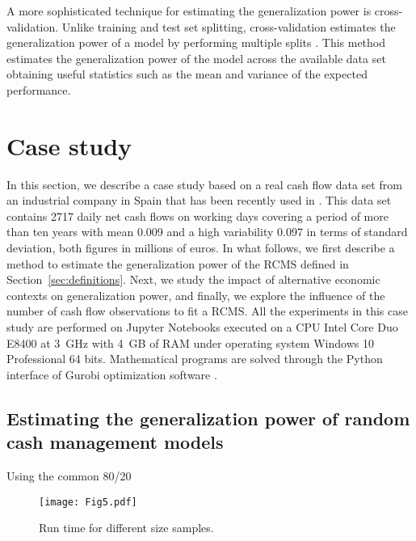 A more sophisticated technique for estimating the generalization power is cross-validation. Unlike training and test set splitting, cross-validation estimates the generalization power of a model by performing multiple splits \citep{hastie2009elements,provost2013data}. This method 
estimates the generalization power of the model across the available data set obtaining useful statistics such as the mean and variance of the expected performance.


\section{Case study\label{sec:case}}


In this section, we describe a case study based on a real cash flow data set from an industrial company in Spain that has been recently used in \cite{salas2017empowering}. This data set contains 2717 daily net cash flows on working days covering a period of more than ten years with mean 0.009 and a high variability 0.097 in terms of standard deviation, both figures in millions of euros. In what follows, we first describe a method to estimate the generalization power of the RCMS defined in Section~\ref{sec:definitions}. Next, we study the impact of alternative economic contexts on generalization power, and finally, we explore the influence of the number of cash flow observations to fit a RCMS. All the experiments in this case study are performed on Jupyter Notebooks executed on a CPU Intel Core Duo E8400 at 3~GHz with 4~GB of RAM under operating system Windows 10 Professional 64 bits. Mathematical programs are solved through the Python interface of Gurobi optimization software \citep{gurobi}.

\subsection{Estimating the generalization power of random cash management models\label{sec:estimating}}


Using the common 80/20 \
\begin{figure}[!htb]
\centering
\texttt{[image: Fig5.pdf]}
\caption{\label{fig:time}Run time for different size samples.}
\end{figure}

